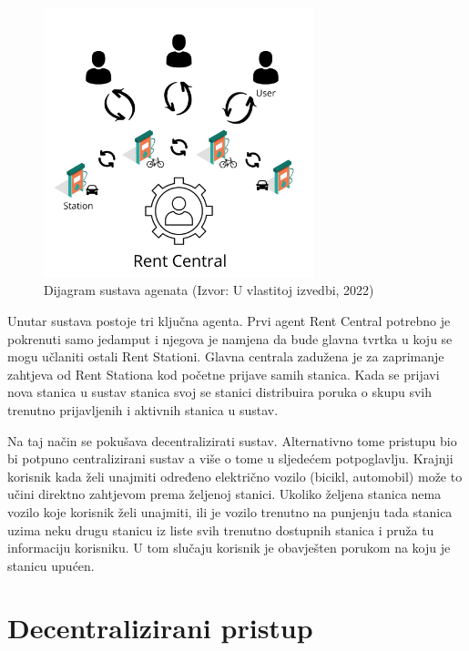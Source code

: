 \documentclass{foi}
\begin{document}
\begin{figure}[h!]
	\centering
	\includegraphics[width=0.7\textwidth]{slike/rentCentral.png}
	\caption{Dijagram sustava agenata (Izvor: U vlastitoj izvedbi, 2022)}
	\label{fig:dijagramAgenti}
\end{figure}

Unutar sustava postoje tri ključna agenta. Prvi agent Rent Central potrebno je pokrenuti samo jedamput i njegova je namjena da bude glavna tvrtka u koju se mogu učlaniti ostali Rent Stationi. Glavna centrala zadužena je za zaprimanje zahtjeva od Rent Stationa kod početne prijave samih stanica. Kada se prijavi nova stanica u sustav stanica svoj se stanici distribuira poruka o skupu svih trenutno prijavljenih i aktivnih stanica u sustav. 

Na taj način se pokušava decentralizirati sustav. Alternativno tome pristupu bio bi potpuno centralizirani sustav a više o tome u sljedećem potpoglavlju. Krajnji korisnik kada želi unajmiti određeno električno vozilo (bicikl, automobil) može to učini direktno zahtjevom prema željenoj stanici. Ukoliko željena stanica nema vozilo koje korisnik želi unajmiti, ili je vozilo trenutno na punjenju tada stanica uzima neku drugu stanicu iz liste svih trenutno dostupnih stanica i pruža tu informaciju korisniku. U tom slučaju korisnik je obavješten porukom na koju je stanicu upućen.

\section{Decentralizirani pristup}
\end{document}

